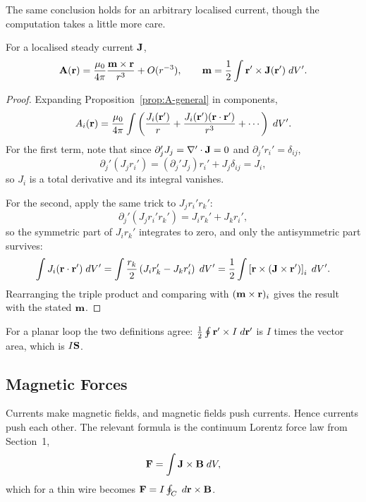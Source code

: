 \documentclass[a4paper]{scrartcl}
\begin{document}
The same conclusion holds for an arbitrary localised current, though the computation takes a little more care.

\begin{proposition}
	For a localised steady current $\mathbf{J}$,
	$$
	\mathbf{A}(\mathbf{r}) = \frac{\mu_0}{4\pi}\frac{\mathbf{m}\times \mathbf{r}}{r^3} + O(r^{-3}), \qquad \mathbf{m} = \frac{1}{2}\int \mathbf{r}'\times \mathbf{J}(\mathbf{r}')\; d V'.
	$$
\end{proposition}
\begin{proof}
	Expanding Proposition~\ref{prop:A-general} in components,
	$$
	A_i(\mathbf{r}) = \frac{\mu_0}{4\pi}\int\left(\frac{J_i(\mathbf{r}')}{r} + \frac{J_i(\mathbf{r}')(\mathbf{r}\cdot \mathbf{r}')}{r^3}+\cdots\right)\; d V'.
	$$
	For the first term, note that since $\partial_j' J_j = \nabla'\cdot \mathbf{J} = 0$ and $\partial_j' r_i' = \delta_{ij}$,
	$$
	\partial_j'(J_j r_i') = (\partial_j'J_j)r_i' + J_j \delta_{ij} = J_i,
	$$
	so $J_i$ is a total derivative and its integral vanishes.

	For the second, apply the same trick to $J_j r_i'r_k'$:
	$$
	\partial_j'(J_j r_i' r_k') = J_i r_k' + J_k r_i',
	$$
	so the symmetric part of $J_ir_k'$ integrates to zero, and only the antisymmetric part survives:
	$$
	\int J_i (\mathbf{r}\cdot\mathbf{r}')\; d V' = \int \frac{r_k}{2}\left(J_ir_k' - J_kr_i'\right)\; d V' = \frac{1}{2}\int \left[\mathbf{r}\times(\mathbf{J}\times\mathbf{r}')\right]_i \; d V'.
	$$
	Rearranging the triple product and comparing with $(\mathbf{m}\times \mathbf{r})_i$ gives the result with the stated $\mathbf{m}$.
\end{proof}

For a planar loop the two definitions agree: $\frac{1}{2}\oint \mathbf{r}'\times I\; d \mathbf{r}'$ is $I$ times the vector area, which is $I\mathbf{S}$.

\subsection{Magnetic Forces}

Currents make magnetic fields, and magnetic fields push currents. Hence currents push each other. The relevant formula is the continuum Lorentz force law from Section~1,
$$
\mathbf{F} = \int \mathbf{J}\times \mathbf{B}\; d V,
$$
which for a thin wire becomes $\mathbf{F} = I\oint_C \; d \mathbf{r}\times \mathbf{B}$.
\end{document}

